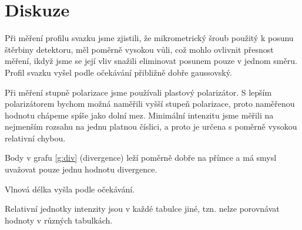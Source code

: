 \section*{Diskuze}
Při měření profilu svazku jsme zjistili, že mikrometrický šroub použitý k posunu štěrbiny detektoru, měl poměrně vysokou vůli, což mohlo ovlivnit přesnost měření, ikdyž jsme se její vliv snažili eliminovat posunem pouze v jednom směru.
Profil svazku vyšel podle očekávání přibližně dobře gaussovský.

Při měření stupně polarizace jsme používali plastový polarizátor. S lepším polarizátorem bychom možná naměřili vyšší stupeň polarizace, proto naměřenou hodnotu chápeme spíše jako dolní mez. Minimální intenzitu jsme měřili na nejmenším rozsahu na jednu platnou číslici, a proto je určena s poměrně vysokou relativní chybou.

Body v grafu \ref{g:div} (divergence) leží poměrně dobře na přímce a má smysl uvažovat pouze jednu hodnotu divergence.

Vlnová délka vyšla podle očekávání.

Relativní jednotky intenzity jsou v každé tabulce jiné, tzn. nelze porovnávat hodnoty v různých tabulkách.